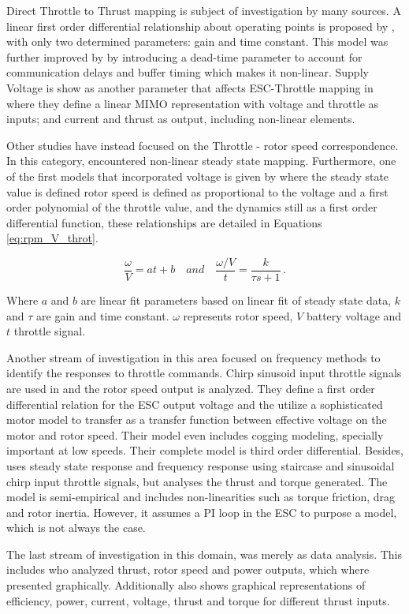 Direct Throttle to Thrust mapping is subject of investigation by many sources. A linear first order differential relationship about operating points is proposed by \cite{Yoon2015}, with only two determined parameters: gain and time constant. This model was further improved by \cite{Torres2020} by introducing a dead-time parameter to account for communication delays and buffer timing which makes it non-linear.
Supply Voltage is show as another parameter that affects ESC-Throttle mapping in \cite{Szafranski2014} where they define a linear MIMO representation with voltage and throttle as inputs; and current and thrust as output, including non-linear elements.
\newline

Other studies have instead focused on the Throttle - rotor speed correspondence. In this category, \cite{Prakosa2019} encountered non-linear steady state mapping. Furthermore, one of the first models that incorporated voltage is given by \cite{Moutinho2015} where the steady state value is defined rotor speed is defined as proportional to the voltage and a first order polynomial of the throttle value, and the dynamics still as a first order differential function, these relationships are detailed in Equations \ref{eq:rpm_V_throt}.

\begin{equation}
 \frac{\omega}{V}= at +b  \quad and \quad \frac{\omega /V}{t}=\frac{k}{\tau s+1}\, .
 \label{eq:rpm_V_throt}   
\end{equation}

Where $a$ and $b$ are linear fit parameters based on linear fit of steady state data, $k$ and $\tau$ are gain and time constant. $\omega$ represents rotor speed, $V$ battery voltage and $t$ throttle signal.
\newline

Another stream of investigation in this area focused on frequency methods to identify the responses to throttle commands. Chirp sinusoid input throttle signals are used in \cite{Xiang2015} and the rotor speed output is analyzed. They define a first order differential relation for the ESC output voltage and the utilize a sophisticated motor model to transfer as a transfer function between effective voltage on the motor and rotor speed. Their model even includes cogging modeling, specially important at low speeds. Their complete model is third order differential.
Besides, \cite{Wu2018} uses steady state response and frequency response using staircase and sinusoidal chirp input throttle signals, but analyses the thrust and torque generated. The model is semi-empirical and includes non-linearities such as torque friction, drag and rotor inertia. However, it assumes a PI loop in the ESC to purpose a model, which is not always the case.

The last stream of investigation in this domain, was merely as data analysis. This includes \cite{Kotarski2017} who analyzed thrust, rotor speed and power outputs, which where presented graphically. Additionally \cite{Sulewski2018} also shows graphical representations of efficiency, power, current, voltage, thrust and torque for different thrust inputs.